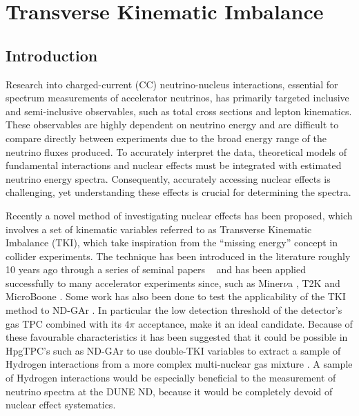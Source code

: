 \begin{savequote}[8cm]
\end{savequote}

\chapter{\label{ch:6-TKI}Transverse Kinematic Imbalance}


\minitoc
\section{Introduction}
Research into charged-current (CC) neutrino-nucleus interactions, essential for spectrum measurements of accelerator neutrinos, has primarily targeted inclusive and semi-inclusive observables, such as total cross sections and lepton kinematics. These observables are highly dependent on neutrino energy and are difficult to compare directly between experiments due to the broad energy range of the neutrino fluxes produced. To accurately interpret the data, theoretical models of fundamental interactions and nuclear effects must be integrated with estimated neutrino energy spectra. Consequently, accurately accessing nuclear effects is challenging, yet understanding these effects is crucial for determining the spectra. 

Recently a novel method of investigating nuclear effects has been proposed, which involves a set of kinematic variables referred to as Transverse Kinematic Imbalance (TKI), which take inspiration from the \enquote{missing energy} concept in collider experiments. The technique has been introduced in the literature roughly 10 years ago through a series of seminal papers ~\cite{Lu:2015hea, PhysRevC.94.015503, PhysRevC.99.055504, Cai:2019jzk} and has been applied successfully to many accelerator experiments since, such as Miner$\nu$a \cite{MINERvA:2018hba, MINERvA:2019ope, MINERvA:2020anu}, T2K \cite{T2K:2018rnz, T2K:2019yqu} and MicroBoone \cite{MicroBooNE:2023tzj}. Some work has also been done to test the applicability of the TKI method to ND-GAr \cite{DUNE:2021NDCDR}. In particular the low detection threshold of the detector's gas TPC combined with its $4\pi$ acceptance, make it an ideal candidate. Because of these favourable characteristics it has been suggested that it could be possible in HpgTPC's such as ND-GAr to use double-TKI variables to extract a sample of Hydrogen  interactions from a more complex multi-nuclear gas mixture \cite{Lu}. A sample of Hydrogen interactions would be especially beneficial to the measurement of neutrino spectra at the DUNE ND, because it would be completely devoid of nuclear effect systematics. 

